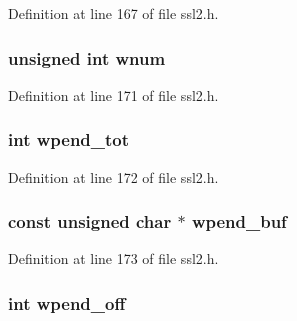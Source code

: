 Definition at line 167 of file ssl2.\+h.

\subsubsection[{\texorpdfstring{wnum}{wnum}}]{\setlength{\rightskip}{0pt plus 5cm}unsigned int wnum}\hypertarget{structssl2__state__st_a2255b8340cdda4fd06078836b88485b8}{}\label{structssl2__state__st_a2255b8340cdda4fd06078836b88485b8}


Definition at line 171 of file ssl2.\+h.

\subsubsection[{\texorpdfstring{wpend\+\_\+tot}{wpend_tot}}]{\setlength{\rightskip}{0pt plus 5cm}int wpend\+\_\+tot}\hypertarget{structssl2__state__st_a11c4b34b49cb1ce9711d3b4f993980fb}{}\label{structssl2__state__st_a11c4b34b49cb1ce9711d3b4f993980fb}


Definition at line 172 of file ssl2.\+h.

\subsubsection[{\texorpdfstring{wpend\+\_\+buf}{wpend_buf}}]{\setlength{\rightskip}{0pt plus 5cm}const unsigned char $\ast$ wpend\+\_\+buf}\hypertarget{structssl2__state__st_ae1aceb1506bb5d92de935aed9b925959}{}\label{structssl2__state__st_ae1aceb1506bb5d92de935aed9b925959}


Definition at line 173 of file ssl2.\+h.

\subsubsection[{\texorpdfstring{wpend\+\_\+off}{wpend_off}}]{\setlength{\rightskip}{0pt plus 5cm}int wpend\+\_\+off}\hypertarget{structssl2__state__st_acee692314aac6c9b66e59e142a214e4b}{}\label{structssl2__state__st_acee692314aac6c9b66e59e142a214e4b}



